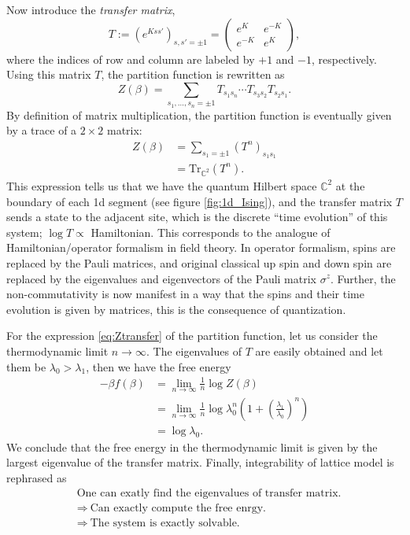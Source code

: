 Now introduce the \emph{transfer matrix},
\begin{equation}
  T  :=  \left(e^{Kss'}\right)_{s,s'=\pm1}
    =
    \left(\begin{array}{ll}
  e^{K}  &  e^{-K}  \\
  e^{-K}  &  e^{K}
\end{array}\right),
\end{equation}
where the indices of row and column are labeled by $+1$ and $-1$,
respectively. Using this matrix $T$, the partition function is rewritten
as
\begin{equation}
  Z\left(\beta\right)
    =\sum_{s_{1},\ldots,s_{n}=\pm1}  T_{s_{1}s_{n}}  \cdots  T_{s_{3}s_{2}}T_{s_{2}s_{1}}.
\end{equation}
By definition of matrix multiplication, the partition function is
eventually given by a trace of a $2\times 2$ matrix:
\begin{align}
  Z(\beta)
  & =  \sum_{s_{1}=\pm1}\left(T^{n}\right)_{s_{1}s_{1}}  \nonumber \\
  & =  \mathrm{Tr}_{\mathbb{C}^{2}}\left(T^{n}\right).
\label{eq:Ztransfer}
\end{align}
This expression tells us that we have the quantum Hilbert space $\mathbb{C}^{2}$
at the boundary of each 1d segment (see figure \ref{fig:1d_Ising}), and the transfer matrix $T$ sends
a state to the adjacent site, which is the discrete ``time evolution''
of this system; $\log T\propto$ Hamiltonian.
This corresponds to the analogue of Hamiltonian/operator
formalism in field theory. In operator formalism, spins
are replaced by the Pauli matrices, and original classical up spin
and down spin are replaced by the eigenvalues and eigenvectors of
the Pauli matrix $\sigma^{z}$. Further, the non-commutativity is
now manifest in a way that the spins and their time evolution is given
by matrices, this is the consequence of quantization.

For the expression \eqref{eq:Ztransfer} of the partition function, let us consider
the thermodynamic limit $n\to\infty$. The eigenvalues of
$T$ are easily obtained and let them be $\lambda_{0}>\lambda_{1}$,
then we have the free energy
\begin{align}
-\beta f(\beta)
  & =  \lim_{n\to\infty}\frac{1}{n}\log Z(\beta)\nonumber \\
  & =  \lim_{n\to\infty}\frac{1}{n}\log\lambda_{0}^n\left(1+\left(\frac{\lambda_{1}}{\lambda_{0}}\right)^{n}\right)\nonumber \\
  & =  \log\lambda_{0}.
\end{align}
We conclude that the free energy in the thermodynamic limit is
given by the largest eigenvalue of the transfer matrix. Finally, integrability
of lattice model is rephrased as
\begin{align*}
  &  \textrm{One can exatly find the eigenvalues of transfer matrix.} \\
  &  \Rightarrow  ~  \textrm{Can exactly compute the free enrgy.} \\
  &  \Rightarrow  ~  \textrm{The system is exactly solvable.}
\end{align*}

